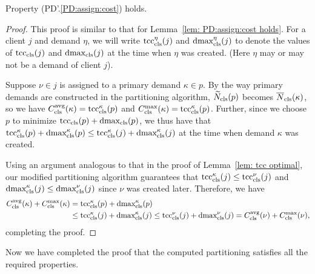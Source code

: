 
\begin{lemma}\label{lem: PD1: primary optimal}
  Property (PD'.\ref{PD:assign:cost}) holds.
\end{lemma}

\begin{proof}
This proof is similar to that for Lemma~\ref{lem: PD:assign:cost holds}.
For a client $j$ and demand $\eta$, we will write
$\tcccls^\eta(j)$ and $\dmaxcls^\eta(j)$ to denote the values of
$\tcccls(j)$ and $\dmaxcls(j)$ at the time when $\eta$
was created. (Here $\eta$ may or may not be a demand of client $j$).

Suppose $\nu \in j$ is assigned to a primary demand $\kappa \in p$.
By the way primary demands are constructed in the partitioning
algorithm, $\wtildeclsnb(p)$ becomes $\wbarclsnb(\kappa)$, so we have
$\clsdist(\kappa) = \tcccls^\kappa (p)$ and $\clsmax(\kappa) =
\tcccls^\kappa(p)$. Further, since we choose $p$ to minimize
$\tcccls(p) + \dmaxcls(p)$, we thus have that $\tcccls^\kappa(p) +
\dmaxcls^\kappa(p) \leq \tcccls^\kappa(j) + \dmaxcls^\kappa(j)$ at the
time when demand $\kappa$ was created.

Using an argument analogous to that in the proof of Lemma~\ref{lem: tcc optimal}, 
our modified partitioning algorithm guarantees that
  $\tcccls^{\kappa}(j) \leq \tcccls^{\nu}(j)$ and
  $\dmaxcls^{\kappa}(j) \leq \dmaxcls^{\nu}(j)$ since $\nu$ was
  created later.
  Therefore, we have
%
  \begin{align*}
    \clsdist(\kappa) + \clsmax(\kappa) &= \tcccls^{\kappa}(p) +	\dmaxcls^{\kappa}(p) 
					\\
					&\leq \tcccls^{\kappa}(j) + \dmaxcls^{\kappa}(j) 
					\leq \tcccls^{\nu}(j) + \dmaxcls^{\nu}(j) 
					= \clsdist(\nu) + \clsmax(\nu),
  \end{align*}
%
completing the proof.
\end{proof}


Now we have completed the proof that the computed partitioning satisfies
all the required properties. 


